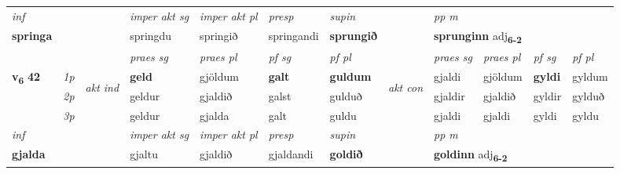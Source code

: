 \begin{longtable}[l]{X>{\footnotesize\itshape}llXXXXlXXXX}
   {\textit{inf}} & &  & \textit{imper akt sg} & \textit{imper akt pl}   & \textit{presp} & \textit{supin}  && \textit{pp m} \\*
  {\textbf{springa}} & && springdu  & springið   & springandi &  \textbf{sprungið}  && \multicolumn{2}{l}{\textbf{sprunginn} adj\textbf{\textsubscript{6-2}}} \\*

\midrule

 & &   & \textit{praes sg}  & \textit{praes pl}    & \textit{ pf sg} & \textit{pf pl} & & \textit{praes sg}  & \textit{praes pl}    & \textit{pf sg} & \textit{pf pl }  \\ \cmidrule{4-7} \cmidrule{9-12}
 \multirow{2}{*}{{{\textbf{v{\textsubscript{6}}} \Large{\textbf{42}}}}}  & 1p & \multirow{3}{*}{\begin{turn}{90}\textit{akt ind}\end{turn}} & \textbf{geld} & gjöldum & \textbf{galt} & \textbf{guldum} & \multirow{3}{*}{\begin{turn}{90}\textit{akt con}\end{turn}} &gjaldi & gjöldum & \textbf{gyldi} & gyldum\\*
 & 2p &  &  geldur  & gjaldið & galst & gulduð & & gjaldir & gjaldið & gyldir & gylduð \\*
 & 3p &  & geldur & gjalda & galt & guldu & & gjaldi & gjaldi& gyldi & gyldu \\*
\cmidrule{4-7} \cmidrule{9-12}

   {\textit{inf}} & &  & \textit{imper akt sg} & \textit{imper akt pl}   & \textit{presp} & \textit{supin}  && \textit{pp m} \\*
  {\textbf{gjalda}} & && gjaltu  & gjaldið   & gjaldandi &  \textbf{goldið}  && \multicolumn{2}{l}{\textbf{goldinn} adj\textbf{\textsubscript{6-2}}} \\*

\midrule


\end{longtable}
